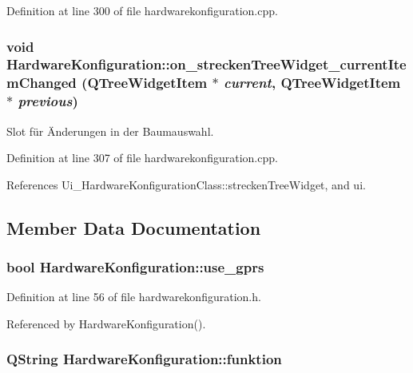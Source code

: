 Definition at line 300 of file hardwarekonfiguration.cpp.\hypertarget{class_hardware_konfiguration_7a08d07a1224b1f4b6e6af2366685463}{
\subsubsection[on\_\-streckenTreeWidget\_\-currentItemChanged]{\setlength{\rightskip}{0pt plus 5cm}void HardwareKonfiguration::on\_\-streckenTreeWidget\_\-currentItemChanged (QTreeWidgetItem $\ast$ {\em current}, \/  QTreeWidgetItem $\ast$ {\em previous})}}
\label{class_hardware_konfiguration_7a08d07a1224b1f4b6e6af2366685463}


Slot für Änderungen in der Baumauswahl. 



Definition at line 307 of file hardwarekonfiguration.cpp.

References Ui\_\-HardwareKonfigurationClass::streckenTreeWidget, and ui.

\subsection{Member Data Documentation}
\hypertarget{class_hardware_konfiguration_d260085054ce59016c19a63b774e9957}{
\subsubsection[use\_\-gprs]{\setlength{\rightskip}{0pt plus 5cm}bool {\bf HardwareKonfiguration::use\_\-gprs}}}
\label{class_hardware_konfiguration_d260085054ce59016c19a63b774e9957}




Definition at line 56 of file hardwarekonfiguration.h.

Referenced by HardwareKonfiguration().\hypertarget{class_hardware_konfiguration_a715366a612f28c1dab5e12d326ad5d6}{
\subsubsection[funktion]{\setlength{\rightskip}{0pt plus 5cm}QString {\bf HardwareKonfiguration::funktion}}}
\label{class_hardware_konfiguration_a715366a612f28c1dab5e12d326ad5d6}




